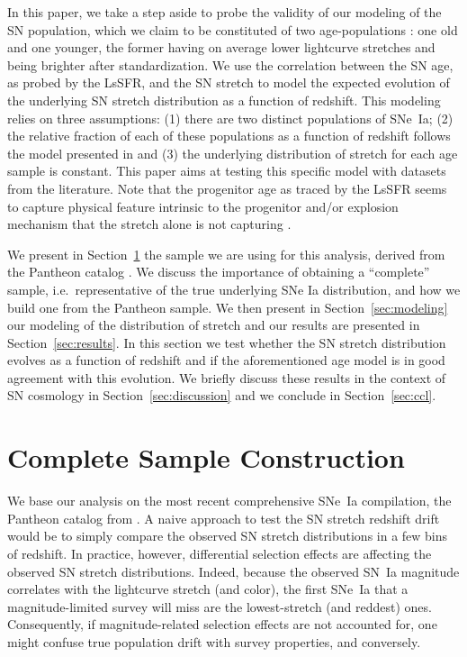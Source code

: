 \documentclass[]{aa} %
\begin{document}
In this paper, we take a step aside to probe the validity of our modeling of the
SN population, which we claim to be constituted of two age-populations
\citep{rigault2013,rigault2015,rigault2018}: one old and one younger, the former
having on average lower lightcurve stretches and being brighter after
standardization. We use the correlation between the SN age, as probed by the
LsSFR, and the SN stretch to model the expected evolution of the underlying SN
stretch distribution as a function of redshift. This modeling relies on three
assumptions: (1) there are two distinct populations of SNe~Ia; (2) the relative
fraction of each of these populations as a function of redshift follows the
model presented in \cite{rigault2018} and (3) the underlying distribution of
stretch for each age sample is constant. This paper aims at testing this
specific model with datasets from the literature. Note that the progenitor age
as traced by the LsSFR seems to capture physical feature intrinsic to the
progenitor and/or explosion mechanism that the stretch alone is not capturing
\citep{nordin2018}.

We present in Section~\ref{sec:sample} the sample we are using for this
analysis, derived from the Pantheon catalog \citep{scolnic2018a}. We discuss the
importance of obtaining a ``complete'' sample, i.e.\ representative of the true
underlying SNe Ia distribution, and how we build one from the Pantheon sample.
We then present in Section~\ref{sec:modeling} our modeling of the distribution
of stretch and our results are presented in Section~\ref{sec:results}. In this
section we test whether the SN stretch distribution evolves as a function of
redshift and if the aforementioned age model is in good agreement with this
evolution. We briefly discuss these results in the context of SN cosmology in
Section~\ref{sec:discussion} and we conclude in Section~\ref{sec:ccl}.

\section{Complete Sample Construction}\label{sec:sample}

We base our analysis on the most recent comprehensive SNe~Ia compilation, the
Pantheon catalog from \cite{scolnic2018a}. A naive approach to test the SN
stretch redshift drift would be to simply compare the observed SN stretch
distributions in a few bins of redshift. In practice, however, differential
selection effects are affecting the observed SN stretch distributions. Indeed,
because the observed SN~Ia magnitude correlates with the lightcurve stretch (and
color), the first SNe~Ia that a magnitude-limited survey will miss are the
lowest-stretch (and reddest) ones. Consequently, if magnitude-related selection
effects are not accounted for, one might confuse true population drift with
survey properties, and conversely.
\end{document}
